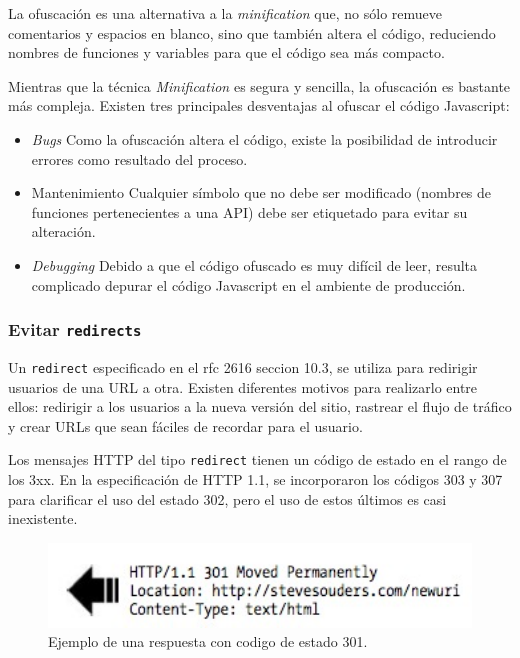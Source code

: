 \documentclass[a4paper,12pt]{report}
\begin{document}
La ofuscación es una alternativa a la \emph{minification} que, no sólo remueve comentarios y
espacios en blanco, sino que también altera el código, reduciendo nombres de funciones y variables para que el código sea más compacto.

Mientras que la técnica \emph{Minification} es segura y sencilla, la ofuscación es bastante más compleja. Existen tres principales desventajas al ofuscar el código Javascript:
\begin{itemize}
\item \emph{Bugs}
Como la ofuscación altera el código, existe la posibilidad de introducir errores como resultado del proceso.
\item Mantenimiento
Cualquier símbolo que no debe ser modificado (nombres de funciones pertenecientes a una API) debe ser etiquetado para evitar su alteración.
\item \emph{Debugging}
Debido a que el código ofuscado es muy difícil de leer, resulta complicado depurar el código Javascript en el ambiente de producción.
\end{itemize}

\subsubsection{Evitar \texttt{redirects}}

Un \texttt{redirect} especificado en el rfc 2616 \cite{rfc2616} seccion 10.3, se utiliza para redirigir usuarios de una URL a otra. Existen diferentes motivos para realizarlo
entre ellos: redirigir a los usuarios a la nueva versión del sitio, rastrear el flujo de tráfico y crear URLs que sean fáciles
de recordar para el usuario.

Los mensajes HTTP del tipo \texttt{redirect} tienen un código de estado en el rango de los 3xx. En la especificación de HTTP 1.1, se incorporaron los códigos 303
y 307 para clarificar el uso del estado 302, pero el uso de estos últimos es casi inexistente.

\begin{figure}[h]
\centering
\includegraphics[width=1\textwidth]{figuras/hpws/redirect.jpg}
	\caption{Ejemplo de una respuesta con codigo de estado 301.}
    \label{fig.redirect}
\end{figure}
\end{document}
